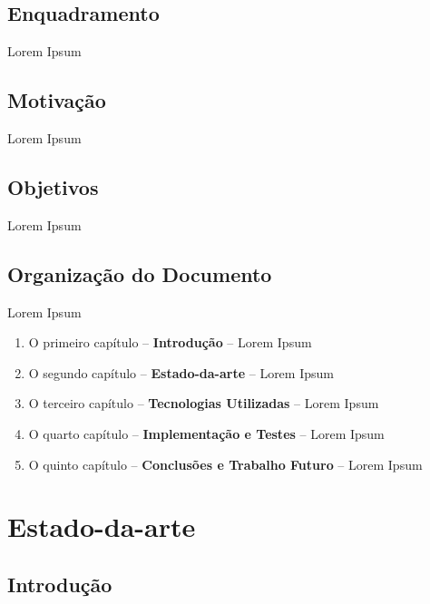\documentclass[12pt,a4paper]{memoir}
\begin{document}
\section{Enquadramento}
\label{sec:amb}

Lorem Ipsum

\section{Motivação}
\label{sec:mot}

Lorem Ipsum

\section{Objetivos}
\label{sec:obj}

Lorem Ipsum

\newpage

\section{Organização do Documento}
\label{sec:organ}

Lorem Ipsum

\begin{enumerate}
\item O primeiro capítulo -- \textbf{Introdução} -- Lorem Ipsum
\item O segundo capítulo -- \textbf{Estado-da-arte} -- Lorem Ipsum
\item O terceiro capítulo -- \textbf{Tecnologias Utilizadas} -- Lorem Ipsum
\item O quarto capítulo -- \textbf{Implementação e Testes} -- Lorem Ipsum
\item O quinto capítulo -- \textbf{Conclusões e Trabalho Futuro} -- Lorem Ipsum
\end{enumerate}

\clearpage{\thispagestyle{empty}\cleardoublepage}



\chapter{Estado-da-arte}
\label{chap:estado-da-arte}

\section{Introdução}
\label{chap2:sec:intro}
\end{document}
